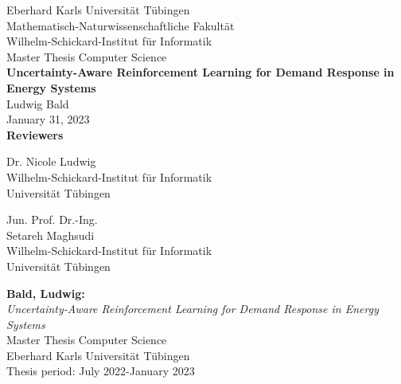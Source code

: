 \documentclass[oneside,12pt,a4paper]{report}
\begin{document}
 
\begin{titlepage}
 \begin{center}
  {\LARGE Eberhard Karls Universit\"at T\"ubingen}\\
  {\large Mathematisch-Naturwissenschaftliche Fakult\"at \\
Wilhelm-Schickard-Institut f\"ur Informatik\\[4cm]}
  {\huge Master Thesis Computer Science\\[2cm]}
  {\Large\bf  Uncertainty-Aware Reinforcement Learning for Demand Response in Energy Systems\\[1.5cm]}
 {\large Ludwig Bald}\\[0.5cm]
  January 31, 2023\\[4cm]
{\small\bf Reviewers}\\[0.5cm]
  \parbox{7cm}{\begin{center}{\large Dr. Nicole Ludwig}\\
  {\footnotesize Wilhelm-Schickard-Institut für Informatik\\
	Universit\"at T\"ubingen}\end{center}}\hfill\parbox{7cm}{\begin{center}
  {\large Jun. Prof. Dr.-Ing.\\ Setareh Maghsudi}\\
  {\footnotesize Wilhelm-Schickard-Institut f\"ur Informatik\\
	Universit\"at T\"ubingen}\end{center}
 }
  \end{center}
\end{titlepage}


\thispagestyle{empty}
\vspace*{\fill}
\begin{minipage}{11.2cm}
\textbf{Bald, Ludwig:}\\
\emph{Uncertainty-Aware Reinforcement Learning for Demand Response in Energy Systems}\\ Master Thesis Computer Science\\
Eberhard Karls Universit\"at T\"ubingen\\
Thesis period: July 2022-January 2023
\end{minipage}
\newpage
\end{document}
